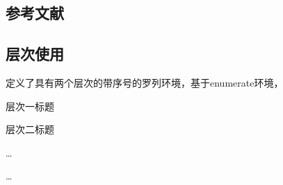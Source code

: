 \documentclass[twoside,maketable]{cauthesis}
\begin{document}
    \subsection{参考文献}
    \cite{王夫之1845--}\cite{KENNEDY1975-339-360}%
    \nocite{汪昂1881--}%

    \subsection{层次使用}
    定义了具有两个层次的带序号的罗列环境，基于enumerate环境，
    \begin{level}{1}
        \item 层次一标题
        \begin{level}{2}
            \item 层次二标题
            \item \ldots
        \end{level}
        \item \ldots
    \end{level}
    
\end{document}
